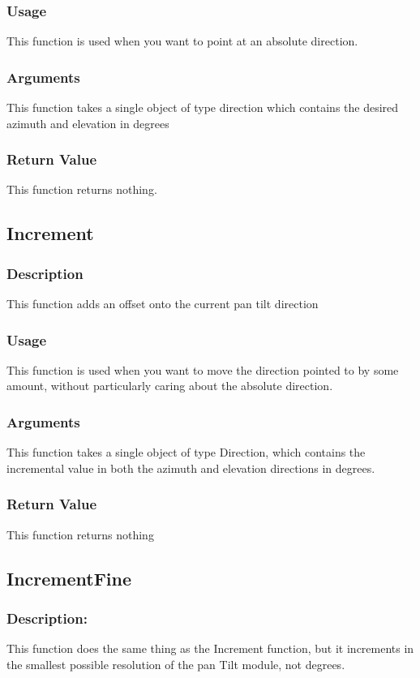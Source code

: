 \documentclass[]{report}
\begin{document}
\subsubsection{Usage}
This function is used when you want to point at an absolute direction.

\subsubsection{Arguments}
This function takes a single object of type direction which contains the desired azimuth and elevation in degrees

\subsubsection{Return Value}
This function returns nothing.

\subsection{Increment}
\subsubsection{Description}
This function adds an offset onto the current pan tilt direction

\subsubsection{Usage}
This function is used when you want to move the direction pointed to by some amount, without particularly caring about the absolute direction.

\subsubsection{Arguments}
This function takes a single object of type Direction, which contains the incremental value in both the azimuth and elevation directions in degrees.

\subsubsection{Return Value}
This function returns nothing

\subsection{IncrementFine}
\subsubsection{Description:}
This function does the same thing as the Increment function, but it increments in the smallest possible resolution of the pan Tilt module, not degrees.
\end{document}
